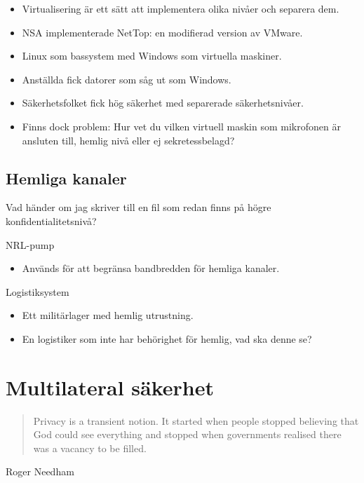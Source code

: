 \documentclass{beamer}
\begin{document}
\begin{frame}{\insertsubsectionhead}
  \begin{itemize}
    \item Virtualisering är ett sätt att implementera olika nivåer och separera 
      dem.
    \item NSA implementerade NetTop: en modifierad version av VMware.
    \item Linux som bassystem med Windows som virtuella maskiner.
    \item Anställda fick datorer som såg ut som Windows.
    \item Säkerhetsfolket fick hög säkerhet med separerade säkerhetsnivåer.
    \item Finns dock problem:
      Hur vet du vilken virtuell maskin som mikrofonen är ansluten till, hemlig 
      nivå eller ej sekretessbelagd?
  \end{itemize}
\end{frame}

\subsection{Hemliga kanaler}
\begin{frame}{\insertsubsectionhead}
  Vad händer om jag skriver till en fil som redan finns på högre 
  konfidentialitetsnivå?
\end{frame}
\begin{frame}{\insertsubsectionhead}{NRL-pump}
  \begin{itemize}
    \item Används för att begränsa bandbredden för hemliga kanaler.
  \end{itemize}
\end{frame}
\begin{frame}{\insertsubsectionhead}{Logistiksystem}
  \begin{itemize}
    \item Ett militärlager med hemlig utrustning.
    \item En logistiker som inte har behörighet för hemlig, vad ska denne se?
  \end{itemize}
\end{frame}


\section{Multilateral säkerhet}
\begin{frame}{\insertsubsectionhead}
  \begin{quote}
    Privacy is a transient notion.
    It started when people stopped believing that God could see everything and 
    stopped when governments realised there was a vacancy to be filled.
  \end{quote}
  \begin{flushright}
    Roger Needham
  \end{flushright}
\end{frame}
\end{document}
